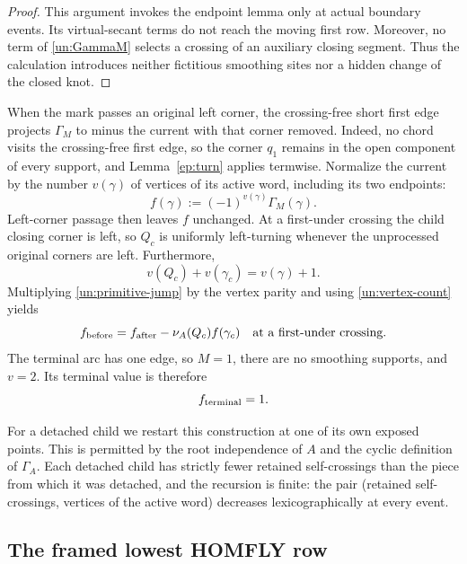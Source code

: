 \documentclass[11pt,letterpaper]{article}
\numberwithin{equation}{section}
\theoremstyle{definition}
\theoremstyle{remark}
\begin{document}
\begin{proof}
This argument invokes the endpoint lemma only at actual boundary
events.  Its virtual-secant terms do not reach the moving first row.
Moreover, no term of \eqref{un:GammaM} selects a crossing of an auxiliary
closing segment.  Thus the calculation introduces neither fictitious
smoothing sites nor a hidden change of the closed knot.
\end{proof}

When the mark passes an original left corner, the crossing-free short
first edge projects $\Gamma_M$ to minus the current with that corner
removed.  Indeed, no chord visits the crossing-free first edge, so the
corner $q_1$ remains in the open component of every support, and
Lemma~\ref{ep:turn} applies termwise.  Normalize the current
by the number $v(\gamma)$ of vertices of its active word, including its
two endpoints:
\begin{equation}
 f(\gamma):=(-1)^{v(\gamma)}\Gamma_M(\gamma).
 \label{un:f}
\end{equation}
Left-corner passage then leaves $f$ unchanged.  At a first-under crossing
the child closing corner is left, so $Q_c$ is uniformly left-turning
whenever the unprocessed original corners are left.  Furthermore,
\begin{equation}
 v(Q_c)+v(\gamma_c)=v(\gamma)+1.
 \label{un:vertex-count}
\end{equation}
Multiplying \eqref{un:primitive-jump} by the vertex parity and using
\eqref{un:vertex-count} yields
\begin{equation}
 f_{\rm before}
   =f_{\rm after}-\nu_A(Q_c)f(\gamma_c)
       \quad\hbox{at a first-under crossing}.
 \label{un:f-recursion}
\end{equation}
The terminal arc has one edge, so $M=1$, there are no smoothing supports,
and $v=2$.  Its terminal value is therefore
\begin{equation}
 f_{\rm terminal}=1.
 \label{un:f-terminal}
\end{equation}

For a detached child we restart this construction at one of its own
exposed points.  This is permitted by the root independence of $A$ and
the cyclic definition of $\Gamma_A$.  Each detached child has strictly
fewer retained self-crossings than the piece from which it was detached,
and the recursion is finite: the pair (retained self-crossings, vertices
of the active word) decreases lexicographically at every event.

\subsection{The framed lowest HOMFLY row}
\label{un:framed}
\end{document}
